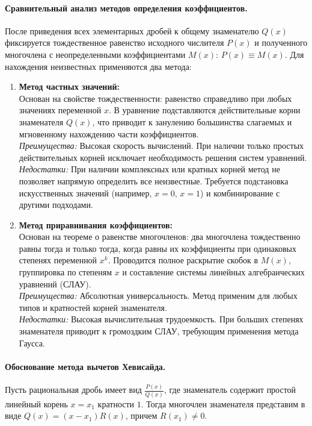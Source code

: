 \paragraph{Сравнительный анализ методов определения коэффициентов.}
После приведения всех элементарных дробей к общему знаменателю $Q(x)$ фиксируется тождественное равенство исходного числителя $P(x)$ и полученного многочлена с неопределенными коэффициентами $M(x)$: $P(x) \equiv M(x)$. Для нахождения неизвестных применяются два метода:

\begin{enumerate}
    \item \textbf{Метод частных значений:}
    \\ Основан на свойстве тождественности: равенство справедливо при любых значениях переменной $x$. В уравнение подставляются действительные корни знаменателя $Q(x)$, что приводит к занулению большинства слагаемых и мгновенному нахождению части коэффициентов.
    \\ \textit{Преимущества:} Высокая скорость вычислений. При наличии только простых действительных корней исключает необходимость решения систем уравнений.
    \\ \textit{Недостатки:} При наличии комплексных или кратных корней метод не позволяет напрямую определить все неизвестные. Требуется подстановка искусственных значений (например, $x=0$, $x=1$) и комбинирование с другими подходами.
    
    \item \textbf{Метод приравнивания коэффициентов:}
    \\ Основан на теореме о равенстве многочленов: два многочлена тождественно равны тогда и только тогда, когда равны их коэффициенты при одинаковых степенях переменной $x^k$. Проводится полное раскрытие скобок в $M(x)$, группировка по степеням $x$ и составление системы линейных алгебраических уравнений (СЛАУ).
    \\ \textit{Преимущества:} Абсолютная универсальность. Метод применим для любых типов и кратностей корней знаменателя.
    \\ \textit{Недостатки:} Высокая вычислительная трудоемкость. При больших степенях знаменателя приводит к громоздким СЛАУ, требующим применения метода Гаусса.
\end{enumerate}

\paragraph{Обоснование метода вычетов Хевисайда.}
Пусть рациональная дробь имеет вид $\frac{P(x)}{Q(x)}$, где знаменатель содержит простой линейный корень $x = x_1$ кратности $1$. Тогда многочлен знаменателя представим в виде $Q(x) = (x - x_1)R(x)$, причем $R(x_1) \neq 0$. 

